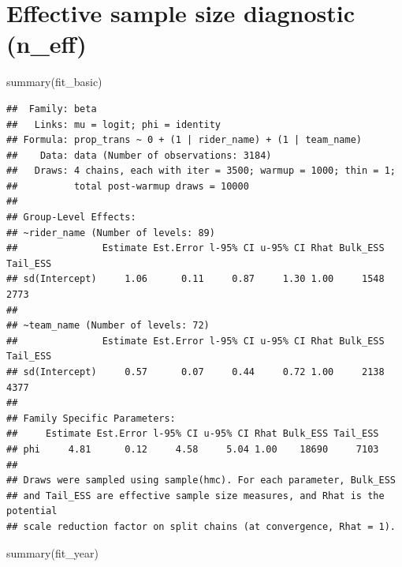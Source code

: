 \documentclass[
]{article}
\newenvironment{Shaded}{\begin{snugshade}}{\end{snugshade}}
\newcommand{\FunctionTok}[1]{\textcolor[rgb]{0.00,0.00,0.00}{#1}}
\newcommand{\NormalTok}[1]{#1}
\begin{document}
\hypertarget{effective-sample-size-diagnostic-n_eff}{%
\section{Effective sample size diagnostic
(n\_eff)}\label{effective-sample-size-diagnostic-n_eff}}

\begin{Shaded}
\begin{Highlighting}[]
\FunctionTok{summary}\NormalTok{(fit\_basic)}
\end{Highlighting}
\end{Shaded}

\begin{verbatim}
##  Family: beta 
##   Links: mu = logit; phi = identity 
## Formula: prop_trans ~ 0 + (1 | rider_name) + (1 | team_name) 
##    Data: data (Number of observations: 3184) 
##   Draws: 4 chains, each with iter = 3500; warmup = 1000; thin = 1;
##          total post-warmup draws = 10000
## 
## Group-Level Effects: 
## ~rider_name (Number of levels: 89) 
##               Estimate Est.Error l-95% CI u-95% CI Rhat Bulk_ESS Tail_ESS
## sd(Intercept)     1.06      0.11     0.87     1.30 1.00     1548     2773
## 
## ~team_name (Number of levels: 72) 
##               Estimate Est.Error l-95% CI u-95% CI Rhat Bulk_ESS Tail_ESS
## sd(Intercept)     0.57      0.07     0.44     0.72 1.00     2138     4377
## 
## Family Specific Parameters: 
##     Estimate Est.Error l-95% CI u-95% CI Rhat Bulk_ESS Tail_ESS
## phi     4.81      0.12     4.58     5.04 1.00    18690     7103
## 
## Draws were sampled using sample(hmc). For each parameter, Bulk_ESS
## and Tail_ESS are effective sample size measures, and Rhat is the potential
## scale reduction factor on split chains (at convergence, Rhat = 1).
\end{verbatim}

\begin{Shaded}
\begin{Highlighting}[]
\FunctionTok{summary}\NormalTok{(fit\_year)}
\end{Highlighting}
\end{Shaded}
\end{document}
